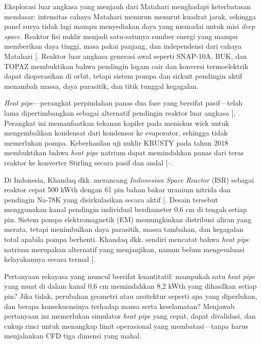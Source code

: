 \documentclass[
  indonesian,
  12pt,
  a4paper,
]{report}
\begin{document}
Eksplorasi luar angkasa yang menjauh dari Matahari menghadapi
keterbatasan mendasar: intensitas cahaya Matahari menurun menurut
kuadrat jarak, sehingga panel surya tidak lagi mampu menyediakan daya
yang memadai untuk misi \emph{deep space}. Reaktor fisi nuklir menjadi
satu-satunya sumber energi yang mampu memberikan daya tinggi, masa pakai
panjang, dan independensi dari cahaya Matahari
{[}\citeproc{ref-elgenk2009}{1}{]}. Reaktor luar angkasa generasi awal
seperti SNAP-10A, BUK, dan TOPAZ membuktikan bahwa pendingin logam cair
dan konversi termoelektrik dapat dioperasikan di orbit, tetapi sistem
pompa dan sirkuit pendingin aktif menambah massa, daya parasitik, dan
titik tunggal kegagalan.

\emph{Heat pipe}---perangkat perpindahan panas dua fase yang bersifat
pasif---telah lama dipertimbangkan sebagai alternatif pendingin reaktor
luar angkasa {[},
\citeproc{ref-dunn2006}{3}{]}. Perangkat ini memanfaatkan tekanan
kapiler pada meniskus wick untuk mengembalikan kondensat dari kondensor
ke evaporator, sehingga tidak memerlukan pompa. Keberhasilan uji nuklir
KRUSTY pada tahun 2018 membuktikan bahwa \emph{heat pipe} natrium dapat
memindahkan panas dari teras reaktor ke konverter Stirling secara pasif
dan andal
{[}--\citeproc{ref-gibson2020}{6}{]}.

Di Indonesia, Khandaq dkk. merancang \emph{Indonesian Space Reactor}
(ISR) sebagai reaktor cepat 500 kWth dengan 61 pin bahan bakar uranium
nitrida dan pendingin Na-78K yang disirkulasikan secara aktif
{[}\citeproc{ref-khandaq2020}{7}{]}. Desain tersebut menggunakan kanal
pendingin individual berdiameter 0,6 cm di tengah setiap pin. Sistem
pompa elektromagnetik (EM) memungkinkan distribusi aliran yang merata,
tetapi menimbulkan daya parasitik, massa tambahan, dan kegagalan total
apabila pompa berhenti. Khandaq dkk. sendiri mencatat bahwa \emph{heat
pipe} natrium merupakan alternatif yang menjanjikan, namun belum
mengevaluasi kelayakannya secara termal
{[}\citeproc{ref-khandaq2020}{7}{]}.

Pertanyaan rekayasa yang muncul bersifat kuantitatif: mampukah satu
\emph{heat pipe} yang muat di dalam kanal 0,6 cm memindahkan 8,2 kWth
yang dihasilkan setiap pin? Jika tidak, perubahan geometri atau
arsitektur seperti apa yang diperlukan, dan berapa konsekuensinya
terhadap massa serta keselamatan? Menjawab pertanyaan ini memerlukan
simulator \emph{heat pipe} yang cepat, dapat divalidasi, dan cukup rinci
untuk menangkap limit operasional yang membatasi---tanpa harus
menjalankan CFD tiga dimensi yang mahal.
\end{document}
